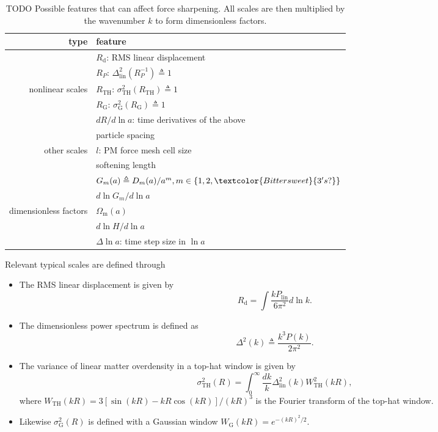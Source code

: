 \documentclass[modern, trackchanges, dvipsnames]{aastex631}
\renewcommand{\d}{d}
\newcommand{\lna}{\ln\!a}
\newcommand{\lnk}{\ln\!k}
\newcommand{\Omegam}{\Omega_\mathrm{m}}
\newcommand{\linear}{\mathrm{lin}}
\newcommand{\tophat}{\mathrm{TH}}
\newcommand{\gauss}{\mathrm{G}}
\newcommand{\YL}[1]{\textcolor{Bittersweet}{#1}}
\begin{document}
\begin{table}
\centering
\caption{TODO Possible features that can affect force sharpening.
All scales are then multiplied by the wavenumber $k$ to form dimensionless
factors.}
\label{tab:feat}
\begin{tabular}{rl}
\toprule
type & feature \\
\midrule
& $R_\mathrm{d}$: RMS linear displacement \\
\cmidrule(lr){2-2}
& $R_P$: $\Delta_\linear^2(R_P^{-1}) \triangleq 1$ \\
\cmidrule(lr){2-2}
nonlinear scales & $R_\tophat$: $\sigma_\tophat^2(R_\tophat) \triangleq 1$ \\
\cmidrule(lr){2-2}
& $R_\gauss$: $\sigma_\gauss^2(R_\gauss) \triangleq 1$ \\
\cmidrule(lr){2-2}
& $\d R / \d\lna$: time derivatives of the above \\
\midrule
& particle spacing \\
\cmidrule(lr){2-2}
other scales & $l$: PM force mesh cell size \\
\cmidrule(lr){2-2}
& softening length \\
\midrule
& $G_m(a) \triangleq D_m(a) / a^m, m \in \{1, 2, \YL{3's?}\}$ \\
\cmidrule(lr){2-2}
& $\d\ln G_m / \d\lna$ \\
\cmidrule(lr){2-2}
dimensionless factors & $\Omegam(a)$ \\
\cmidrule(lr){2-2}
& $\d\ln\!H / \d\lna$ \\
\cmidrule(lr){2-2}
& $\Delta\lna$: time step size in $\lna$ \\
\bottomrule
\end{tabular}
\end{table}

Relevant typical scales are defined through
\begin{itemize}
\item The RMS linear displacement is given by
%
\begin{equation}
R_\mathrm{d} = \int \frac{k P_\linear}{6\pi^2} \d\lnk.
\end{equation}
%
\item The dimensionless power spectrum is defined as
%
\begin{equation}
\Delta^2(k) \triangleq \frac{k^3 P(k)}{2 \pi^2}.
\end{equation}
%
\item The variance of linear matter overdensity in a top-hat window is given by
%
\begin{equation}
\sigma_\tophat^2(R) = \int_0^\infty \frac{\d k}k
  \Delta_\linear^2(k) W_\tophat^2(kR),
\end{equation}
%
where $W_\tophat(kR) = 3[\sin(kR) - kR\cos(kR)] / (kR)^3$ is the
Fourier transform of the top-hat window.
\item Likewise $\sigma_\gauss^2(R)$ is defined with a Gaussian window
$W_\gauss(kR) = e^{-(kR)^2/2}$.
\end{itemize}
\end{document}
